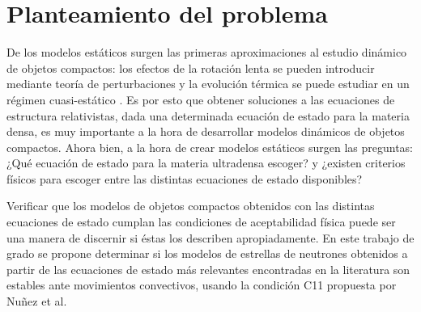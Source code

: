 \chapter{Planteamiento del problema}
De los modelos estáticos surgen las primeras aproximaciones al estudio dinámico de objetos compactos: los efectos de la rotación lenta se pueden introducir mediante teoría de perturbaciones \cite{Hartle1967} y la evolución térmica se puede estudiar en un régimen cuasi-estático \cite{Becerra2013Quasi-staticObjects}. Es por esto que obtener soluciones a las ecuaciones de estructura relativistas, dada una determinada ecuación de estado para la materia densa, es muy importante a la hora de desarrollar modelos dinámicos de objetos compactos.
Ahora bien, a la hora de crear modelos estáticos surgen las preguntas: ¿Qué ecuación de estado para la materia ultradensa escoger? y  ¿existen criterios físicos para escoger entre las distintas ecuaciones de estado disponibles? 

Verificar que los modelos de objetos compactos obtenidos con las distintas ecuaciones de estado cumplan las condiciones de aceptabilidad física puede ser una manera de discernir si éstas los describen apropiadamente. En este trabajo de grado se propone determinar si los modelos de estrellas de neutrones obtenidos a partir de las ecuaciones de estado más relevantes encontradas en la literatura son estables ante movimientos convectivos, usando la condición C11 propuesta por Nuñez et al.
